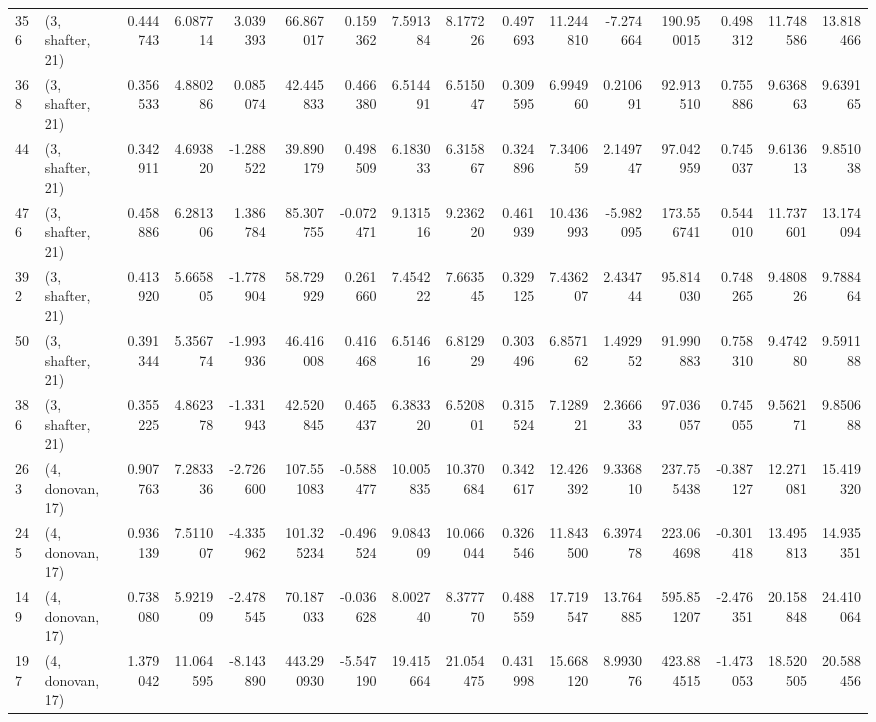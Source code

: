 \begin{tabular}{llrrrrrrrrrrrrrr}
356 &  (3, shafter, 21) &   0.444743 &   6.087714 &   3.039393 &    66.867017 &   0.159362 &   7.591384 &   8.177226 &  0.497693 &  11.244810 &  -7.274664 &   190.950015 &  0.498312 &  11.748586 &  13.818466 \\
368 &  (3, shafter, 21) &   0.356533 &   4.880286 &   0.085074 &    42.445833 &   0.466380 &   6.514491 &   6.515047 &  0.309595 &   6.994960 &   0.210691 &    92.913510 &  0.755886 &   9.636863 &   9.639165 \\
44  &  (3, shafter, 21) &   0.342911 &   4.693820 &  -1.288522 &    39.890179 &   0.498509 &   6.183033 &   6.315867 &  0.324896 &   7.340659 &   2.149747 &    97.042959 &  0.745037 &   9.613613 &   9.851038 \\
476 &  (3, shafter, 21) &   0.458886 &   6.281306 &   1.386784 &    85.307755 &  -0.072471 &   9.131516 &   9.236220 &  0.461939 &  10.436993 &  -5.982095 &   173.556741 &  0.544010 &  11.737601 &  13.174094 \\
392 &  (3, shafter, 21) &   0.413920 &   5.665805 &  -1.778904 &    58.729929 &   0.261660 &   7.454222 &   7.663545 &  0.329125 &   7.436207 &   2.434744 &    95.814030 &  0.748265 &   9.480826 &   9.788464 \\
50  &  (3, shafter, 21) &   0.391344 &   5.356774 &  -1.993936 &    46.416008 &   0.416468 &   6.514616 &   6.812929 &  0.303496 &   6.857162 &   1.492952 &    91.990883 &  0.758310 &   9.474280 &   9.591188 \\
386 &  (3, shafter, 21) &   0.355225 &   4.862378 &  -1.331943 &    42.520845 &   0.465437 &   6.383320 &   6.520801 &  0.315524 &   7.128921 &   2.366633 &    97.036057 &  0.745055 &   9.562171 &   9.850688 \\
263 &  (4, donovan, 17) &   0.907763 &   7.283336 &  -2.726600 &   107.551083 &  -0.588477 &  10.005835 &  10.370684 &  0.342617 &  12.426392 &   9.336810 &   237.755438 & -0.387127 &  12.271081 &  15.419320 \\
245 &  (4, donovan, 17) &   0.936139 &   7.511007 &  -4.335962 &   101.325234 &  -0.496524 &   9.084309 &  10.066044 &  0.326546 &  11.843500 &   6.397478 &   223.064698 & -0.301418 &  13.495813 &  14.935351 \\
149 &  (4, donovan, 17) &   0.738080 &   5.921909 &  -2.478545 &    70.187033 &  -0.036628 &   8.002740 &   8.377770 &  0.488559 &  17.719547 &  13.764885 &   595.851207 & -2.476351 &  20.158848 &  24.410064 \\
197 &  (4, donovan, 17) &   1.379042 &  11.064595 &  -8.143890 &   443.290930 &  -5.547190 &  19.415664 &  21.054475 &  0.431998 &  15.668120 &   8.993076 &   423.884515 & -1.473053 &  18.520505 &  20.588456 \\

\end{tabular}
